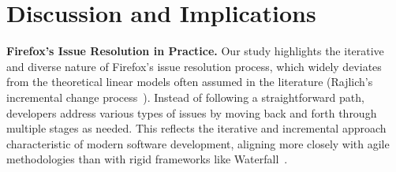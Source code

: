 \section{Discussion and Implications}
\label{sec:implication_usefulness}

\textbf{Firefox's Issue Resolution in Practice.} 
Our study highlights the iterative and diverse nature of Firefox's issue resolution process, which widely deviates from the theoretical linear models often assumed in the literature (\eg Rajlich's incremental change process~\cite{rajlich2011software}). Instead of following a straightforward path, developers address various types of issues by moving back and forth through multiple stages as needed. This reflects the iterative and incremental approach characteristic of modern software development, aligning more closely with agile methodologies than with rigid frameworks like Waterfall~\cite{rajlich2011software}.

